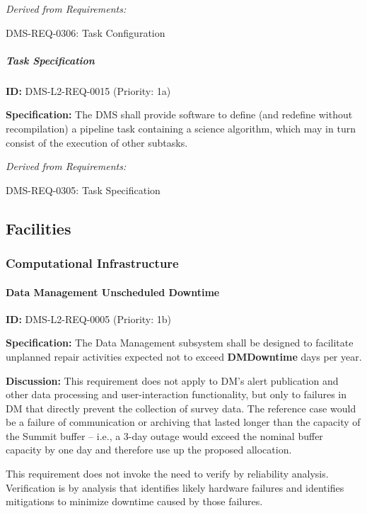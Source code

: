 \documentclass[SE,toc,lsstdraft]{lsstdoc}
\begin{document}
\emph{Derived from Requirements:}

DMS-REQ-0306:
Task Configuration \newline

\subparagraph{Task Specification}\hfill  %

\label{DMS-L2-REQ-0015}
\textbf{ID:} DMS-L2-REQ-0015 (Priority: 1a)

\textbf{Specification:} The DMS shall provide software to define (and redefine without recompilation) a pipeline task containing a science algorithm, which may in turn consist of the execution of other subtasks.

\emph{Derived from Requirements:}

DMS-REQ-0305:
Task Specification \newline

\subsection{Facilities}

\subsubsection{Computational Infrastructure}

\paragraph{Data Management Unscheduled Downtime}\hfill  %

\label{DMS-L2-REQ-0005}
\textbf{ID:} DMS-L2-REQ-0005 (Priority: 1b)

\textbf{Specification:} The Data Management subsystem shall be designed to facilitate unplanned repair activities expected not to exceed \textbf{DMDowntime} days per year.

\textbf{Discussion:} This requirement does not apply to DM's alert publication and other data processing and user-interaction functionality, but only to failures in DM that directly prevent the collection of survey data. The reference case would be a failure of communication or archiving that lasted longer than the capacity of the Summit buffer -- i.e., a 3-day outage would exceed the nominal buffer capacity by one day and therefore use up the proposed allocation.

This requirement does not invoke the need to verify by reliability analysis. Verification is by analysis that identifies likely hardware failures and identifies mitigations to minimize downtime caused by those failures.
\end{document}
